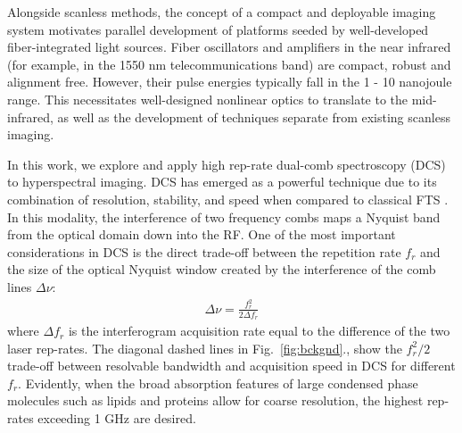 \documentclass[aip,reprint]{revtex4-1}
\begin{document}

Alongside scanless methods, the concept of a compact and deployable imaging system motivates parallel development of platforms seeded by well-developed fiber-integrated light sources. Fiber oscillators and amplifiers in the near infrared (for example, in the 1550 nm telecommunications band) are compact, robust and alignment free. However, their pulse energies typically fall in the 1 - 10 nanojoule range. This necessitates well-designed nonlinear optics to translate to the mid-infrared, as well as the development of techniques separate from existing scanless imaging.




In this work, we explore and apply high rep-rate dual-comb spectroscopy (DCS) to hyperspectral imaging. DCS has emerged as a powerful technique due to its combination of resolution, stability, and speed when compared to classical FTS \cite{coddingtonDualcombSpectroscopy2016}. In this modality, the interference of two frequency combs maps a Nyquist band from the optical domain down into the RF. One of the most important considerations in DCS is the direct trade-off between the repetition rate $f_r$ and the size of the optical Nyquist window created by the interference of the comb lines $\Delta \nu$:
% 
\begin{align}
    \Delta \nu = \frac{f_r^2}{2 \Delta f_r}
    \label{eq:dcs}
\end{align}
% 
where $\Delta f_r$ is the interferogram acquisition rate equal to the difference of the two laser rep-rates. The diagonal dashed lines in \mbox{Fig. \ref{fig:bckgnd}}., show the $f_r^2/2$ trade-off between resolvable bandwidth and acquisition speed in DCS for different $f_r$. Evidently, when the broad absorption features of large condensed phase molecules such as lipids and proteins allow for coarse resolution, the highest rep-rates exceeding 1 GHz are desired. 
\end{document}
